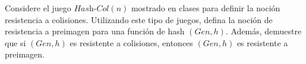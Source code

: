 
Considere el juego $\textit{Hash-Col}(n)$ mostrado en clases para definir la noción resistencia a colisiones. Utilizando este tipo de juegos, defina la noción de resistencia a preimagen para una función de hash $(\textit{Gen}, h)$. Además, demuestre que si $(\textit{Gen}, h)$ es resistente a colisiones, entonces $(\textit{Gen}, h)$ es resistente a preimagen.
